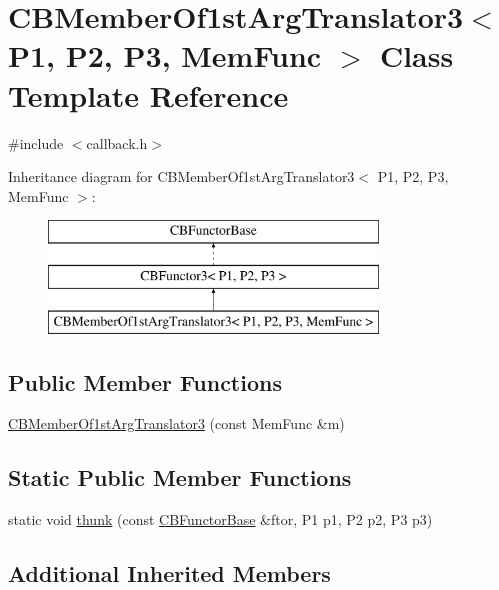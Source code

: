 \hypertarget{class_c_b_member_of1st_arg_translator3}{\section{C\+B\+Member\+Of1st\+Arg\+Translator3$<$ P1, P2, P3, Mem\+Func $>$ Class Template Reference}
\label{class_c_b_member_of1st_arg_translator3}
}


{\ttfamily \#include $<$callback.\+h$>$}

Inheritance diagram for C\+B\+Member\+Of1st\+Arg\+Translator3$<$ P1, P2, P3, Mem\+Func $>$\+:\begin{figure}[H]
\begin{center}
\leavevmode
\includegraphics[height=3.000000cm]{class_c_b_member_of1st_arg_translator3}
\end{center}
\end{figure}
\subsection*{Public Member Functions}
\begin{DoxyCompactItemize}
\item 
\hyperlink{class_c_b_member_of1st_arg_translator3_a0d0af6a625075314d7639aa6ed40c574}{C\+B\+Member\+Of1st\+Arg\+Translator3} (const Mem\+Func \&m)
\end{DoxyCompactItemize}
\subsection*{Static Public Member Functions}
\begin{DoxyCompactItemize}
\item 
static void \hyperlink{class_c_b_member_of1st_arg_translator3_adb8aa106ab7d055c2088cb12b01669b5}{thunk} (const \hyperlink{class_c_b_functor_base}{C\+B\+Functor\+Base} \&ftor, P1 p1, P2 p2, P3 p3)
\end{DoxyCompactItemize}
\subsection*{Additional Inherited Members}


